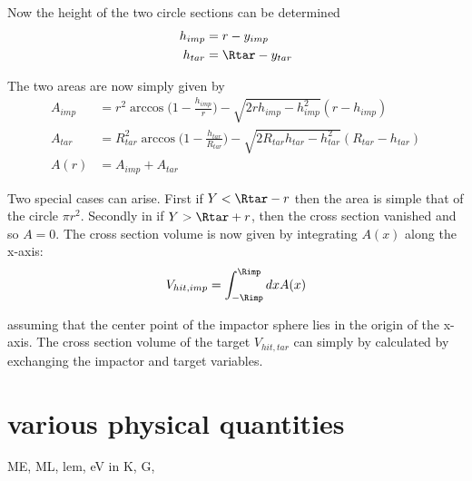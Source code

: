 Now the height of the two circle sections can be determined
\begin{align}
\label{ch07_sec01_eq003}
h_{imp} &= r - y_{imp}\\
h_{tar} &= \Rtar - y_{tar} 
\end{align}

The two areas are now simply given by
\begin{align}
\label{ch07_sec01_eq004}
A_{imp} &= r^2 \arccos{\Big( 1 - \frac{h_{imp}}{r} \Big) } - \sqrt{2 r h_{imp} - h_{imp}^2} (r - h_{imp} )  \\
A_{tar} &= R_{tar}^2 \arccos{\Big(1 - \frac{h_{tar}}{R_{tar}} \Big)  } - \sqrt{2 R_{tar} h_{tar} - h_{tar}^2} (R_{tar} - h_{tar} )  \\
A(r) &= A_{imp} + A_{tar}
\end{align}

Two special cases can arise. First if $Y < \Rtar - r $ then the area is simple that of the circle $\pi r^2$. Secondly in if $Y > \Rtar + r$, then the cross section vanished and so $A = 0$. The cross section volume is now given by integrating $A(x)$ along the x-axis:
\begin{align}
\label{ch07_sec01_eq002}
V_{hit, imp} = \int_{-\Rimp}^{\Rimp} dx A(x)
\end{align}

assuming that the center point of the impactor sphere lies in the origin of the x-axis. The cross section volume of the target $V_{hit, tar}$ can simply by calculated by exchanging the impactor and target variables. 


\clearpage

\section{various physical quantities}
ME, ML, lem, eV in K, G, 






